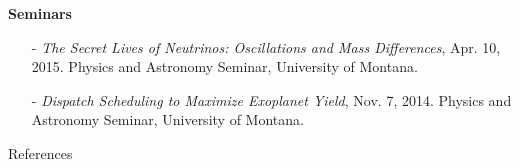 \documentclass{article}
\begin{document}
{\large{\bf Seminars}}
\begin{itemize}
\item[-] \textit{The Secret Lives of Neutrinos: Oscillations and Mass Differences}, Apr. 10, 2015. Physics and Astronomy Seminar, University of Montana.
\item[-] \textit{Dispatch Scheduling to Maximize Exoplanet Yield}, Nov. 7, 2014. Physics and Astronomy Seminar, University of Montana.

\end{itemize}

\pagebreak

\iffalse
{\large{\bf Non-technical Employment}}
\begin{itemize}
\item[]{\large{Good Food Store}}, Missoula, MT\hfill{\bf{April 2012-Oct. 2013}}
\begin{itemize}
\item Deli and beverage bar staff, customer service, teamwork, task management
\item Received multiple commendations on helpfulness and safety
\end{itemize}

\item[] {\large{The Huckleberry People}}, Missoula, MT\hfill{\bf{Sept. 2011-April 2012}}
\begin{itemize}
\item Production based job working in warehouse environment
\item Time management, order assembly, manual dexterity
\end{itemize}

\item[]{\large{Papa Murphy's Pizza}}, Missoula, MT\hfill{\bf{July 2009-Sept. 2011}}
\begin{itemize}
\item Supervisor position, delegating tasks to crews of 5-10 members
\item Customer service, money handling, problem solving, conflict resolution

\end{itemize}
\end{itemize}

\fi









\iffalse

{\large{References}}
\end{document}
